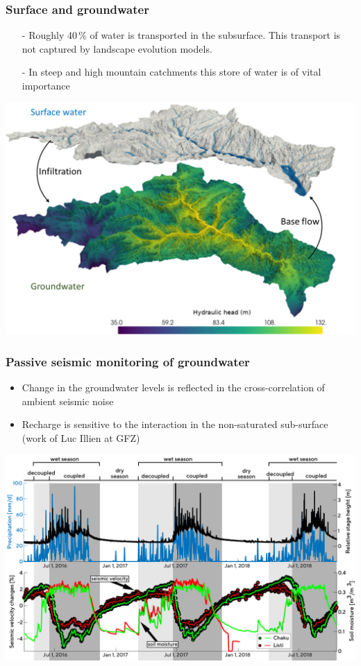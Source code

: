 \documentclass[aspectratio=169]{beamer}
\begin{document}
\begin{frame}
    \frametitle{Surface and groundwater}
    \begin{itemize}
        \item[-]{Roughly 40\,\% of water is transported in the subsurface. This transport is not captured by landscape evolution models.}
        \item[-]{In steep and high mountain catchments this store of water is of vital importance}
    \end{itemize}
    \centering
    \includegraphics[width=0.6\paperwidth]{./pictures/graphic1.png}
\end{frame}

\begin{frame}
    \frametitle{Passive seismic monitoring of groundwater}
    \begin{itemize}
        \item{Change in the groundwater levels is reflected in the cross-correlation of ambient seismic noise}
        \item{Recharge is sensitive to the interaction in the non-saturated sub-surface (work of Luc Illien at GFZ)}
    \end{itemize}
    \centering
    \includegraphics[height=0.5\paperheight]{./figures/illien-figure2.png}
\end{frame}
\end{document}
